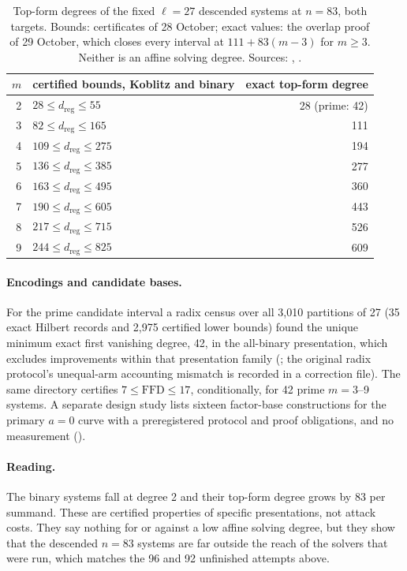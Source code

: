 \begin{table}[t]
\centering\small
\begin{tabular}{@{}rlr@{}}
\toprule
$m$ & certified bounds, Koblitz and binary & exact top-form degree \\
\midrule
2 & $28\le d_{\mathrm{reg}}\le55$ & 28 (prime: 42) \\
3 & $82\le d_{\mathrm{reg}}\le165$ & 111 \\
4 & $109\le d_{\mathrm{reg}}\le275$ & 194 \\
5 & $136\le d_{\mathrm{reg}}\le385$ & 277 \\
6 & $163\le d_{\mathrm{reg}}\le495$ & 360 \\
7 & $190\le d_{\mathrm{reg}}\le605$ & 443 \\
8 & $217\le d_{\mathrm{reg}}\le715$ & 526 \\
9 & $244\le d_{\mathrm{reg}}\le825$ & 609 \\
\bottomrule
\end{tabular}
\caption[]{Top-form degrees of the fixed $\ell=27$ descended systems at
$n=83$, both targets. Bounds: certificates of 28 October; exact values:
the overlap proof of 29 October, which closes every interval at
$111+83(m-3)$ for $m\ge3$. Neither is an affine solving degree. Sources:
,
.}
\label{tab:n83l-top}
\end{table}

\paragraph{Encodings and candidate bases.} For the prime candidate
interval a radix census over all 3{,}010 partitions of 27 (35 exact Hilbert
records and 2{,}975 certified lower bounds) found the unique minimum exact
first vanishing degree, 42, in the all-binary presentation, which excludes
improvements within that presentation family
(; the original radix
protocol's unequal-arm accounting mismatch is recorded in a correction file).
The same directory certifies $7\le\text{FFD}\le17$, conditionally, for 42
prime $m=3$--9 systems. A separate design study lists sixteen factor-base
constructions for the primary $a=0$ curve with a preregistered protocol and
proof obligations, and no measurement
().

\paragraph{Reading.} The binary systems fall at degree 2 and their top-form
degree grows by 83 per summand. These are certified properties of
specific presentations, not attack costs. They say nothing for or against a
low affine solving degree, but they show that the descended $n=83$ systems
are far outside the reach of the solvers that were run, which matches the
96 and 92 unfinished attempts above.

